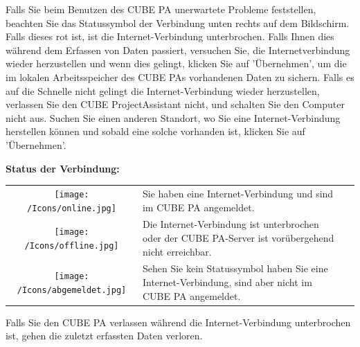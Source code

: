 \vspace{\baselineskip}

Falls Sie beim Benutzen des CUBE PA unerwartete Probleme feststellen, beachten Sie das Statussymbol der Verbindung unten rechts auf dem Bildschirm. Falls dieses rot ist, ist die Internet-Verbindung unterbrochen. Falls Ihnen dies während dem Erfassen von Daten passiert, versuchen Sie, die Internetverbindung wieder herzustellen und wenn dies gelingt, klicken Sie auf 'Übernehmen', um die im lokalen Arbeitsspeicher des CUBE PAs vorhandenen Daten zu sichern. Falls es auf die Schnelle nicht gelingt die Internet-Verbindung wieder herzustellen, verlassen Sie den CUBE ProjectAssistant nicht, und schalten Sie den Computer nicht aus. Suchen Sie einen anderen Standort, wo Sie eine Internet-Verbindung herstellen
können und sobald eine solche vorhanden ist, klicken Sie auf 'Übernehmen'.


\pagebreak
\textbf{Status der Verbindung:}

\vspace{\baselineskip}

\begin{tabular}{c | p{14cm} l} %

\vspace{+1pt}	
\texttt{[image: /Icons/online.jpg]} & Sie haben eine Internet-Verbindung und sind im CUBE PA angemeldet. \\
\vspace{+1pt}	
\texttt{[image: /Icons/offline.jpg]} & Die Internet-Verbindung ist unterbrochen oder der CUBE PA-Server ist vorübergehend nicht erreichbar. \\
\vspace{+1pt}	
\texttt{[image: /Icons/abgemeldet.jpg]} & Sehen Sie kein Statussymbol haben Sie eine Internet-Verbindung, sind aber nicht im CUBE PA angemeldet. \\


\end{tabular}

\vspace{\baselineskip}

Falls Sie den CUBE PA verlassen während die Internet-Verbindung unterbrochen ist, gehen die zuletzt erfassten Daten verloren.

